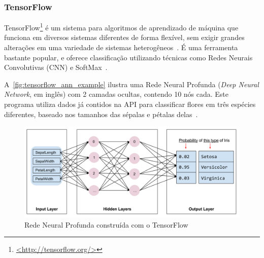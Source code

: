 
\subsubsection{TensorFlow}\label{sec:ml_tf}

TensorFlow\footnote{\href{http://tensorflow.org/}{<http://tensorflow.org/>}} é um sistema para algoritmos de aprendizado de máquina que funciona em diversos sistemas diferentes de forma flexível, sem exigir grandes alterações em uma variedade de sistemas heterogêneos~\cite{abadi:2016}. É uma ferramenta bastante popular, e oferece classificação utilizando técnicas como Redes Neurais Convolutivas (CNN) e SoftMax~\cite{ertram:2017}.


A~\autoref{fig:tensorflow_ann_example} ilustra uma Rede Neural Profunda (\textit{Deep Neural Network}, em inglês) com 2 camadas ocultas, contendo 10 nós cada. Este programa utiliza dados já contidos na API para classificar flores em três espécies diferentes, baseado nos tamanhos das sépalas e pétalas delas~\cite{tensorflow:premade_estimators}.

\begin{figure}[ht]
	\caption{\label{fig:tensorflow_ann_example}Rede Neural Profunda construída com o TensorFlow}
	\begin{center}
	    \includegraphics[width=\textwidth]{resources/tensorflow_ann_example}
	\end{center}
\end{figure}


